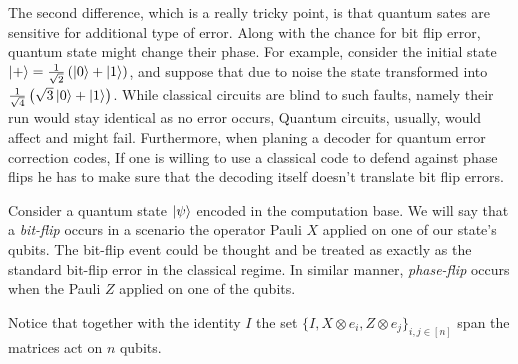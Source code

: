 The second difference, which is a really tricky point, is that quantum sates are sensitive for additional type of error. Along with the chance for bit flip error, quantum state might change their phase. For example, consider the initial state $\ket{+} = \frac{1}{\sqrt{2}}\left( \ket{0} + \ket{1} \right)$, and suppose that due to noise the state transformed into $\frac{1}{\sqrt{4}}\left( \sqrt{3}\ket{0} + \ket{1} \right)$. While classical circuits are blind to such faults, namely their run would stay identical as no error occurs, Quantum circuits, usually, would affect and might fail. Furthermore, when planing a decoder for quantum error correction codes, If one is willing to use a classical code to defend against phase flips he has to make sure that the decoding itself doesn't translate bit flip errors. 
\begin{definition} \label{def:bphf}  
  Consider a quantum state $\ket{\psi}$ encoded in the computation base. We will say that a \textit{bit-flip} occurs in a scenario the operator Pauli $X$ applied on one of our state's qubits. The bit-flip event could be thought and be treated as exactly as the standard bit-flip error in the classical regime. In similar manner, \textit{phase-flip} occurs when the Pauli $Z$ applied on one of the qubits. 

  Notice that together with the identity $I$ the set $\{I, X \otimes e_{i} , Z \otimes e_{j} \}_{i,j \in [n]}$ span the matrices act on $n$ qubits.  
\end{definition}

 
